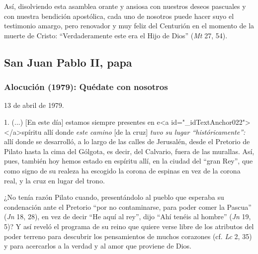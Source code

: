 			\begin{body}Así, disolviendo esta asamblea orante y ansiosa con nuestros deseos pascuales y con nuestra bendición apostólica, cada uno de nosotros puede hacer suyo el testimonio amargo, pero renovador y muy feliz del Centurión en el momento de la muerte de Cristo: “Verdaderamente este era el Hijo de Dios” (\textit{Mt }27, 54).\end{body}
			
			\subsection{San Juan Pablo II, papa}
			
			\subsubsection{Alocución (1979): Quédate con nosotros}
			
			\begin{referencia}13 de abril de 1979.\end{referencia}
			
			\begin{body} 1. (...) [En este día] estamos siempre presentes en e<a id="_idTextAnchor022"></a>spíritu allí donde \textit{este camino }[de la cruz] \textit{tuvo su lugar “históricamente”:} allí donde se desarrolló, a lo largo de las calles de Jerusalén, desde el Pretorio de Pilato hasta la cima del Gólgota, es decir, del Calvario, fuera de las murallas. Así, pues, también hoy hemos estado en espíritu allí, en la ciudad del “gran Rey”, que como signo de su realeza ha escogido la corona de espinas en vez de la corona real, y la cruz en lugar del trono.\end{body}
			
			\begin{body}¿No tenía razón Pilato cuando, presentándolo al pueblo que esperaba su condenación ante el Pretorio “por no contaminarse, para poder comer la Pascua” (\textit{Jn} 18, 28), en vez de decir “He aquí al rey”, dijo “Ahí tenéis al hombre” (\textit{Jn} 19, 5)? Y así reveló el programa de su reino que quiere verse libre de los atributos del poder terreno para descubrir los pensamientos de muchos corazones (cf. \textit{Lc} 2, 35) y para acercarlos a la verdad y al amor que proviene de Dios.\end{body}
			
